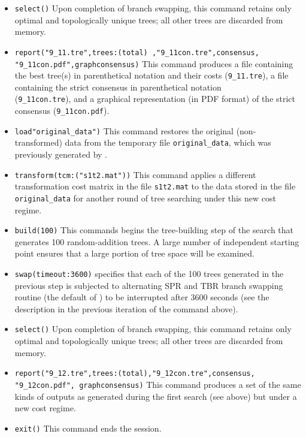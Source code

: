 \begin{itemize}
\item \texttt{select()} Upon completion of branch swapping, this command retains only optimal and topologically 
unique trees; all other trees are discarded from memory.
\item \texttt{report("9\_11.tre",trees:(total) ,"9\_11con.tre",consensus,\\ "9\_11con.pdf",graphconsensus)} This command 
produces a file containing the best tree(s) in parenthetical notation and their costs (\texttt{9\_11.tre}), a file containing the 
strict consensus in parenthetical notation \\(\texttt{9\_11con.tre}), and a graphical representation (in PDF format) of the 
strict consensus (\texttt{9\_11con.pdf}).
\item \texttt{load"original\_data")} This command restores the original (non-trans\-formed) data from the temporary file 
\texttt{original\_data}, which was previously generated by .
\item \texttt{transform(tcm:("s1t2.mat"))} This command applies a different transformation cost matrix in the file 
\texttt{s1t2.mat} to the data stored in the file \texttt{original\_data} for another round of tree searching under this new cost regime.
\item \texttt{build(100)} This commands begins the tree-building step of the search that generates 100 random-addition 
trees. A large number of independent starting point ensures that a large portion of tree space will be 
examined.
\item \texttt{swap(timeout:3600)}  specifies that each of the 100 trees generated in the previous step is 
subjected to alternating SPR and TBR branch swapping routine (the default of \poy) to be interrupted after 3600 
seconds (see the description in the previous iteration of the command above).
\item \texttt{select()} Upon completion of branch swapping, this command retains only optimal and topologically 
unique trees; all other trees are discarded from memory.
\item \texttt{report("9\_12.tre",trees:(total),"9\_12con.tre",consensus,\\"9\_12con.pdf", graphconsensus)} This command 
produces a set of the same kinds of outputs as generated during the first search (see above) but under a new cost 
regime.
\item \texttt{exit()} This command ends the \poy session.
\end{itemize}

